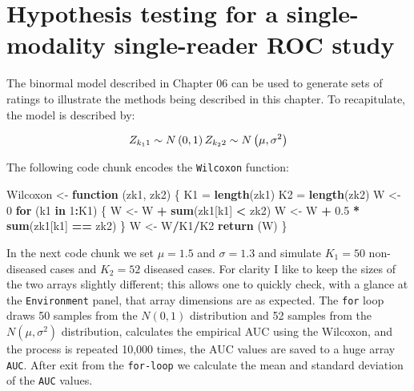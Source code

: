 \documentclass[
]{book}
\newenvironment{Shaded}{\begin{snugshade}}{\end{snugshade}}
\newcommand{\ControlFlowTok}[1]{\textcolor[rgb]{0.13,0.29,0.53}{\textbf{#1}}}
\newcommand{\DecValTok}[1]{\textcolor[rgb]{0.00,0.00,0.81}{#1}}
\newcommand{\FloatTok}[1]{\textcolor[rgb]{0.00,0.00,0.81}{#1}}
\newcommand{\KeywordTok}[1]{\textcolor[rgb]{0.13,0.29,0.53}{\textbf{#1}}}
\newcommand{\NormalTok}[1]{#1}
\newcommand{\OperatorTok}[1]{\textcolor[rgb]{0.81,0.36,0.00}{\textbf{#1}}}
\newcommand{\StringTok}[1]{\textcolor[rgb]{0.31,0.60,0.02}{#1}}
\begin{document}
\hypertarget{hypothesis-testing-for-a-single-modality-single-reader-roc-study}{%
\section{Hypothesis testing for a single-modality single-reader ROC study}\label{hypothesis-testing-for-a-single-modality-single-reader-roc-study}}

The binormal model described in Chapter 06 can be used to generate sets of ratings to illustrate the methods being described in this chapter. To recapitulate, the model is described by:

\begin{equation*} 
Z_{k_11} \sim N\left ( 0,1 \right )\\
Z_{k_22} \sim N\left ( \mu,\sigma^2 \right )
\end{equation*}

The following code chunk encodes the \texttt{Wilcoxon} function:

\begin{Shaded}
\begin{Highlighting}[]
\NormalTok{Wilcoxon \textless{}{-}}\StringTok{ }\ControlFlowTok{function}\NormalTok{ (zk1, zk2)}
\NormalTok{\{}
\NormalTok{  K1 =}\StringTok{ }\KeywordTok{length}\NormalTok{(zk1)}
\NormalTok{  K2 =}\StringTok{ }\KeywordTok{length}\NormalTok{(zk2)}
\NormalTok{  W \textless{}{-}}\StringTok{ }\DecValTok{0}
  \ControlFlowTok{for}\NormalTok{ (k1 }\ControlFlowTok{in} \DecValTok{1}\OperatorTok{:}\NormalTok{K1) \{}
\NormalTok{    W \textless{}{-}}\StringTok{ }\NormalTok{W }\OperatorTok{+}\StringTok{ }\KeywordTok{sum}\NormalTok{(zk1[k1] }\OperatorTok{\textless{}}\StringTok{ }\NormalTok{zk2)}
\NormalTok{    W \textless{}{-}}\StringTok{ }\NormalTok{W }\OperatorTok{+}\StringTok{ }\FloatTok{0.5} \OperatorTok{*}\StringTok{ }\KeywordTok{sum}\NormalTok{(zk1[k1] }\OperatorTok{==}\StringTok{ }\NormalTok{zk2)}
\NormalTok{  \}}
\NormalTok{  W \textless{}{-}}\StringTok{ }\NormalTok{W}\OperatorTok{/}\NormalTok{K1}\OperatorTok{/}\NormalTok{K2}
  \KeywordTok{return}\NormalTok{ (W)}
\NormalTok{\}}
\end{Highlighting}
\end{Shaded}

In the next code chunk we set \(\mu = 1.5\) and \(\sigma = 1.3\) and simulate \(K_1 = 50\) non-diseased cases and \(K_2 = 52\) diseased cases. For clarity I like to keep the sizes of the two arrays slightly different; this allows one to quickly check, with a glance at the \texttt{Environment} panel, that array dimensions are as expected. The \texttt{for} loop draws 50 samples from the \(N(0,1)\) distribution and 52 samples from the \(N(\mu,\sigma^2)\) distribution, calculates the empirical AUC using the Wilcoxon, and the process is repeated 10,000 times, the AUC values are saved to a huge array \texttt{AUC}. After exit from the \texttt{for-loop} we calculate the mean and standard deviation of the \texttt{AUC} values.
\end{document}

